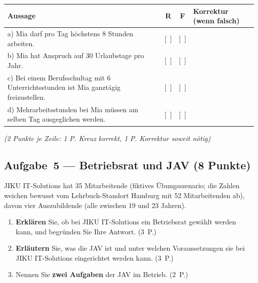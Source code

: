 \documentclass[11pt, a4paper]{article}
\begin{document}
\begin{center}
\begin{tabular}{p{7.5cm} c c p{4.5cm}}
\toprule
\textbf{Aussage} & \textbf{R} & \textbf{F} & \textbf{Korrektur (wenn falsch)}\\
\midrule
a) Mia darf pro Tag höchstens 8 Stunden arbeiten. & {[~]} & {[~]} & \underline{\hspace{4cm}}\\[1.5em]
b) Mia hat Anspruch auf 30 Urlaubstage pro Jahr. & {[~]} & {[~]} & \underline{\hspace{4cm}}\\[1.5em]
c) Bei einem Berufsschultag mit 6 Unterrichtsstunden ist Mia ganztägig freizustellen. & {[~]} & {[~]} & \underline{\hspace{4cm}}\\[1.5em]
d) Mehrarbeitsstunden bei Mia müssen am selben Tag ausgeglichen werden. & {[~]} & {[~]} & \underline{\hspace{4cm}}\\[1em]
\bottomrule
\end{tabular}
\end{center}
\textit{(2 Punkte je Zeile: 1 P. Kreuz korrekt, 1 P. Korrektur soweit nötig)}

\subsection*{Aufgabe~5 --- Betriebsrat und JAV (8 Punkte)}

JIKU IT-Solutions hat 35 Mitarbeitende (fiktives Übungsszenario; die Zahlen weichen bewusst vom Lehrbuch-Standort Hamburg mit 52 Mitarbeitenden ab), davon vier Auszubildende (alle zwischen 19 und 23 Jahren).

\begin{enumerate}[label=(\alph*)]
  \item \textbf{Erklären} Sie, ob bei JIKU IT-Solutions ein Betriebsrat gewählt werden kann, und begründen Sie Ihre Antwort. \hfill (3~P.)

  \vspace{3cm}

  \item \textbf{Erläutern} Sie, was die JAV ist und unter welchen Voraussetzungen sie bei JIKU IT-Solutions eingerichtet werden kann. \hfill (3~P.)

  \vspace{3cm}

  \item Nennen Sie \textbf{zwei Aufgaben} der JAV im Betrieb. \hfill (2~P.)

  \vspace{2cm}
\end{enumerate}
\end{document}
